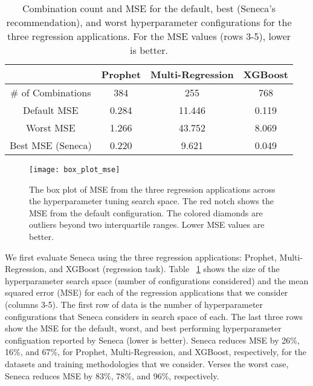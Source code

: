 \begin{table}
\centering
\begin{tabular}{|c|c|c|c|}
\hline
& Prophet & Multi-Regression & XGBoost\\
\hline
\# of Combinations & 384 & 255 & 768\\
\hline
\hline
Default MSE & 0.284 & 11.446 & 0.119 \\
\hline
Worst MSE & 1.266 & 43.752 & 8.069 \\
\hline
Best MSE (Seneca) & 0.220 & 9.621 & 0.049 \\
\hline
\end{tabular}
\caption{Combination count and MSE for the default, 
best (Seneca's recommendation), 
and worst hyperparameter configurations for the three regression applications. 
For the MSE  values (rows 3-5), lower is better.
\label{tab:mse}}
\end{table}

\begin{figure}[t] \centering 
\texttt{[image: box\_plot\_mse]}
\caption{The box plot of MSE from the three regression applications 
across the hyperparameter tuning search space. 
The red notch shows the MSE from the default configuration. 
The colored diamonds are outliers beyond two interquartile ranges. 
Lower MSE values are better.
\label{fig:box_plot_mse}}
\vspace{-0.2in}
\end{figure}

We first evaluate Seneca using the three regression applications: 
Prophet, Multi-Regression, and XGBoost (regression task). 
Table ~\ref{tab:mse} shows the size of the hyperparameter search space (number of configurations
considered) and the mean squared error (MSE)
for each of the regression applications that we consider (columns 3-5).
The first row of data is 
 the number of hyperparameter configurations that Seneca considers in search space of each. 
The last three rows show the MSE for the default, worst, and best performing 
hyperparameter configuation reported by Seneca (lower is better).  
Seneca reduces MSE by 26\%, 16\%, and 67\%, for Prophet, Multi-Regression, and XGBoost,
respectively, for the datasets and training methodologies that we consider.
Verses the worst case, Seneca reduces MSE by 83\%, 78\%, and 96\%, respectively.

